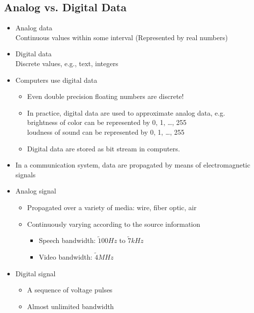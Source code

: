 \documentclass[11pt]{article}
\begin{document}
\subsection{Analog vs. Digital Data}
\begin{itemize}
    \item Analog data \\
    Continuous values within some interval (Represented by real numbers)
    \item Digital data \\
    Discrete values, e.g., text, integers
    \item Computers use digital data
    \begin{itemize}
        \item Even double precision floating numbers are discrete!
        \item In practice, digital data are used to approximate analog data, e.g.\ \\
        brightness of color can be represented by 0, 1, …, 255 \\
        loudness of sound can be represented by 0, 1, …, 255
        \item Digital data are stored as bit stream in computers.
    \end{itemize}
    \item In a communication system, data are propagated by means of electromagnetic signals
    \item Analog signal
    \begin{itemize}
        \item Propagated over a variety of media: wire, fiber optic, air
        \item Continuously varying according to the source information
        \begin{itemize}
            \item Speech bandwidth: \(\tilde 100Hz\) to \(\tilde 7kHz\)
            \item Video bandwidth: \(\tilde 4MHz\)
        \end{itemize}
    \end{itemize}
    \item Digital signal
    \begin{itemize}
        \item A sequence of voltage pulses
        \item Almost unlimited bandwidth
    \end{itemize}
\end{itemize}
\end{document}
